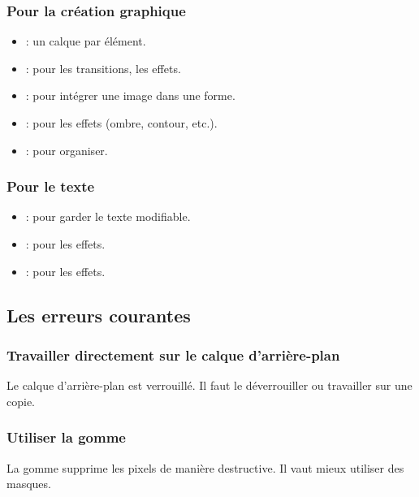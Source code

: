 \subsubsection{Pour la création graphique}

\begin{itemize}
    \item {} : un calque par élément.
    \item {} : pour les transitions, les effets.
    \item {} : pour intégrer une image dans une forme.
    \item {} : pour les effets (ombre, contour, etc.).
    \item {} : pour organiser.
\end{itemize}

\subsubsection{Pour le texte}

\begin{itemize}
    \item {} : pour garder le texte modifiable.
    \item {} : pour les effets.
    \item {} : pour les effets.
\end{itemize}

\subsection{Les erreurs courantes}

\subsubsection{Travailler directement sur le calque d'arrière-plan}

Le calque d'arrière-plan est verrouillé. Il faut le déverrouiller ou travailler sur une copie.

\subsubsection{Utiliser la gomme}

La gomme supprime les pixels de manière destructive. Il vaut mieux utiliser des masques.

